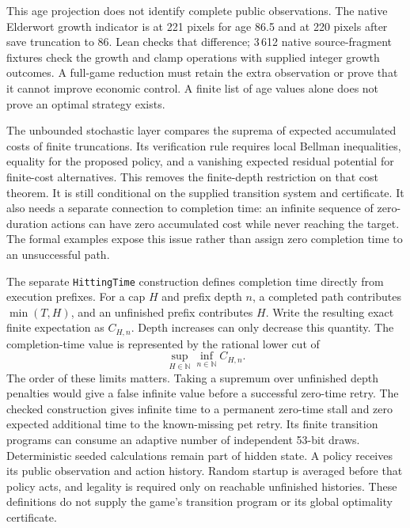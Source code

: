 \documentclass[11pt,a4paper]{article}
\numberwithin{equation}{section}
\theoremstyle{definition}
\theoremstyle{remark}
\begin{document}
This age projection does not identify complete public observations. The native Elderwort growth indicator is at 221 pixels for age 86.5 and at 220 pixels after save truncation to 86. Lean checks that difference; 3\,612 native source-fragment fixtures check the growth and clamp operations with supplied integer growth outcomes. A full-game reduction must retain the extra observation or prove that it cannot improve economic control. A finite list of age values alone does not prove an optimal strategy exists.

The unbounded stochastic layer compares the suprema of expected accumulated costs of finite truncations. Its verification rule requires local Bellman inequalities, equality for the proposed policy, and a vanishing expected residual potential for finite-cost alternatives. This removes the finite-depth restriction on that cost theorem. It is still conditional on the supplied transition system and certificate. It also needs a separate connection to completion time: an infinite sequence of zero-duration actions can have zero accumulated cost while never reaching the target. The formal examples expose this issue rather than assign zero completion time to an unsuccessful path.

The separate \texttt{HittingTime} construction defines completion time directly from execution prefixes. For a cap $H$ and prefix depth $n$, a completed path contributes $\min(T,H)$, and an unfinished prefix contributes $H$. Write the resulting exact finite expectation as $C_{H,n}$. Depth increases can only decrease this quantity. The completion-time value is represented by the rational lower cut of
\[
 \sup_{H\in\mathbb N}\inf_{n\in\mathbb N} C_{H,n}.
\]
The order of these limits matters. Taking a supremum over unfinished depth penalties would give a false infinite value before a successful zero-time retry. The checked construction gives infinite time to a permanent zero-time stall and zero expected additional time to the known-missing pet retry. Its finite transition programs can consume an adaptive number of independent 53-bit draws. Deterministic seeded calculations remain part of hidden state. A policy receives its public observation and action history. Random startup is averaged before that policy acts, and legality is required only on reachable unfinished histories. These definitions do not supply the game's transition program or its global optimality certificate.
\end{document}
